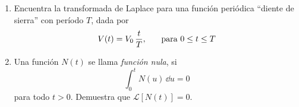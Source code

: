 \begin{enumerate}
\item Encuentra la transformada de Laplace para una función periódica \enquote{diente de sierra} con período $T$, dada por
\[ V(t) = V_{0} \, \dfrac{t}{T}, \hspace{0.5cm} \mbox{ para } 0 \leq t \leq T \]
\item Una función $N(t)$ se llama \emph{función nula}, si
\[ \int_{0}^{t} N(u) \, \dd u = 0 \]
para todo $t > 0$. Demuestra que $\mathcal{L} [N(t)] = 0$.

\end{enumerate}
